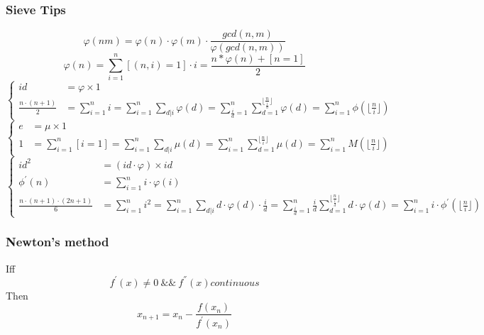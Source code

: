 \documentclass[10pt]{ctexart}
\begin{document}
{{\subsubsection{Sieve Tips}
\begin{equation}
    \varphi(nm) = \varphi(n) \cdot \varphi(m) \cdot \frac{gcd(n,m)}{\varphi(gcd(n,m))}
\end{equation}
\begin{equation}
\varphi(n) = \sum_{i=1}^n[(n,i)=1]\cdot i=\frac{n* \varphi(n)+[n=1]}{2}
\end{equation}
\begin{equation}
\left\{
    \begin{aligned}
        id &= \varphi \times 1 \\
        \frac{n \cdot (n + 1)}{2} &= \sum_{i=1}^n i = \sum_{i=1}^n \sum_{d|i}\varphi(d) = \sum_{\frac{i}{d} = 1}^n \sum_{d=1}^{\lfloor\frac{n}{\frac{i}{d}}\rfloor} \varphi(d) = \sum_{i=1}^n \phi(\lfloor\frac{n}{i}\rfloor) 
    \end{aligned}
\right.
\end{equation}
\begin{equation}
\left\{
    \begin{aligned}
        e &= \mu \times 1 \\
        1 &= \sum_{i=1}^n [i=1] = \sum_{i=1}^n \sum_{d|i} \mu(d) = \sum_{i=1}^n\sum_{d=1}^{\lfloor\frac{n}{i}\rfloor} \mu(d) = \sum_{i=1}^n M(\lfloor\frac{n}{i}\rfloor)
    \end{aligned}
\right.
\end{equation}
\begin{equation}
\left\{
    \begin{aligned}
        id^2 &= (id \cdot \varphi) \times id \\
        \phi ^\prime (n) &= \sum_{i=1}^n i \cdot \varphi(i) \\
        \frac{n \cdot (n + 1) \cdot (2n + 1)}{6} &= \sum_{i=1}^n i^2 = \sum_{i=1}^n \sum_{d|i} d \cdot \varphi(d) \cdot \frac {i}{d} = \sum_{\frac{i}{d}=1}^{n} \frac{i}{d} \sum_{d=1}^{\lfloor{\frac{n}{\frac{i}{d}}}\rfloor} d \cdot \varphi(d) = \sum_{i=1}^n i \cdot \phi ^\prime (\lfloor\frac{n}{i}\rfloor)
    \end{aligned}
\right.
\end{equation}
\subsubsection{Newton's method}
Iff
$$
f^{'}(x) \neq 0 \ \&\& \ f^{''}(x) continuous
$$
Then
$$
x_{n+1} = x_n - \frac{f(x_n)}{f^{'}(x_n)}
$$
}}
\end{document}
